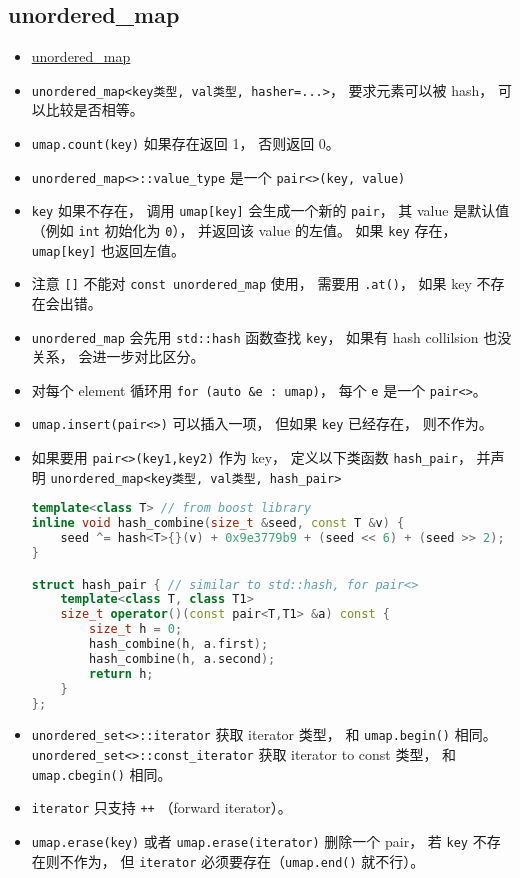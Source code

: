 \subsection{unordered\_map}
\begin{itemize}
\item \href{https://cplusplus.com/reference/unordered_map/unordered_map/}{unordered\_map}
\item \verb|unordered_map<key类型, val类型, hasher=...>|， 要求元素可以被 hash， 可以比较是否相等。
\item \verb|umap.count(key)| 如果存在返回 1， 否则返回 0。
\item \verb|unordered_map<>::value_type| 是一个 \verb|pair<>(key, value)|
\item \verb|key| 如果不存在， 调用 \verb|umap[key]| 会生成一个新的 \verb|pair|， 其 value 是默认值 （例如 \verb|int| 初始化为 \verb|0|）， 并返回该 value 的左值。 如果 \verb|key| 存在， \verb|umap[key]| 也返回左值。
\item 注意 \verb|[]| 不能对 \verb|const unordered_map| 使用， 需要用 \verb|.at()|， 如果 key 不存在会出错。
\item \verb|unordered_map| 会先用 \verb|std::hash| 函数查找 \verb|key|， 如果有 hash collilsion 也没关系， 会进一步对比区分。
\item 对每个 element 循环用 \verb|for (auto &e : umap)|， 每个 \verb|e| 是一个 \verb|pair<>|。
\item \verb|umap.insert(pair<>)| 可以插入一项， 但如果 \verb|key| 已经存在， 则不作为。
\item 如果要用 \verb|pair<>(key1,key2)| 作为 key， 定义以下类函数 \verb|hash_pair|， 并声明 \verb|unordered_map<key类型, val类型, hash_pair>|
\begin{lstlisting}[language=cpp]
template<class T> // from boost library
inline void hash_combine(size_t &seed, const T &v) {
    seed ^= hash<T>{}(v) + 0x9e3779b9 + (seed << 6) + (seed >> 2);
}

struct hash_pair { // similar to std::hash, for pair<>
    template<class T, class T1>
    size_t operator()(const pair<T,T1> &a) const {
        size_t h = 0;
        hash_combine(h, a.first);
        hash_combine(h, a.second);
        return h;
    }
};
\end{lstlisting}
\item \verb|unordered_set<>::iterator| 获取 iterator 类型， 和 \verb|umap.begin()| 相同。 \verb|unordered_set<>::const_iterator| 获取 iterator to const 类型， 和 \verb|umap.cbegin()| 相同。
\item \verb|iterator| 只支持 \verb|++| （forward iterator）。
\item \verb|umap.erase(key)| 或者 \verb|umap.erase(iterator)| 删除一个 pair， 若 \verb|key| 不存在则不作为， 但 \verb|iterator| 必须要存在（\verb|umap.end()| 就不行）。
\end{itemize}

